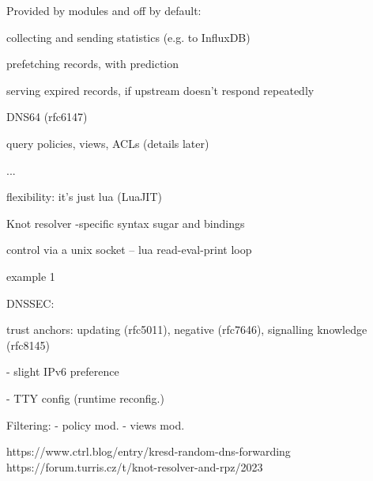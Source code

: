\endBulletList


Provided by modules and off by default:
\bulletList
\item collecting and sending statistics (e.g. to InfluxDB)
\item prefetching records, with prediction
\item serving expired records, if upstream doesn't respond repeatedly
\item DNS64 (rfc6147)
\item query policies, views, ACLs (details later)
\item ...
\endBulletList


\slide[Configuration]
\bulletList
\item flexibility: it's just lua (LuaJIT)
\item Knot resolver -specific syntax sugar and bindings
\item control via a unix socket -- lua read-eval-print loop
\item {\tti example 1}
\endBulletList


\slide
DNSSEC:
\item trust anchors: updating (rfc5011), negative (rfc7646), signalling knowledge (rfc8145)

- slight IPv6 preference

- TTY config (runtime reconfig.)

Filtering:
- policy mod.
- views mod.

https://www.ctrl.blog/entry/kresd-random-dns-forwarding
https://forum.turris.cz/t/knot-resolver-and-rpz/2023



\bye
